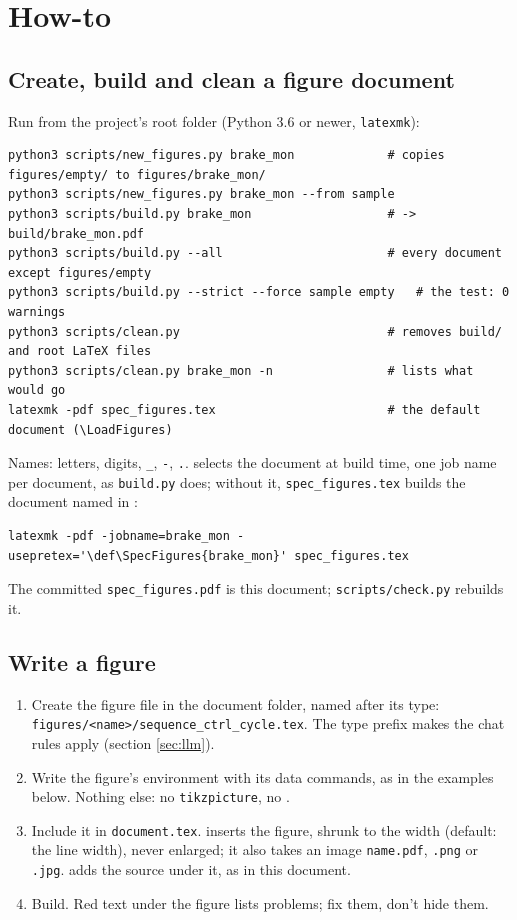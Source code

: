 \section{How-to}

\subsection{Create, build and clean a figure document}

Run from the project's root folder (Python 3.6 or newer, \texttt{latexmk}):

\begin{Verbatim}[frame=single]
python3 scripts/new_figures.py brake_mon             # copies figures/empty/ to figures/brake_mon/
python3 scripts/new_figures.py brake_mon --from sample
python3 scripts/build.py brake_mon                   # -> build/brake_mon.pdf
python3 scripts/build.py --all                       # every document except figures/empty
python3 scripts/build.py --strict --force sample empty   # the test: 0 warnings
python3 scripts/clean.py                             # removes build/ and root LaTeX files
python3 scripts/clean.py brake_mon -n                # lists what would go
latexmk -pdf spec_figures.tex                        # the default document (\LoadFigures)
\end{Verbatim}

Names: letters, digits, \texttt{_}, \texttt{-}, \texttt{.}.  selects the document at build time, one job name per document, as \texttt{build.py} does; without it, \texttt{spec_figures.tex} builds the document named in :

\begin{Verbatim}[frame=single]
latexmk -pdf -jobname=brake_mon -usepretex='\def\SpecFigures{brake_mon}' spec_figures.tex
\end{Verbatim}
 The committed \texttt{spec_figures.pdf} is this document; \texttt{scripts/check.py} rebuilds it.

\subsection{Write a figure}

\begin{enumerate}
  \item Create the figure file in the document folder, named after its type: \texttt{figures/<name>/sequence_ctrl_cycle.tex}. The type prefix makes the chat rules apply (section \ref{sec:llm}).
  \item Write the figure's environment with its data commands, as in the examples below. Nothing else: no \texttt{tikzpicture}, no .
  \item Include it in \texttt{document.tex}.  inserts the figure, shrunk to the width (default: the line width), never enlarged; it also takes an image \texttt{name.pdf}, \texttt{.png} or \texttt{.jpg}.  adds the source under it, as in this document.
  \item Build. Red text under the figure lists problems; fix them, don't hide them.
\end{enumerate}

